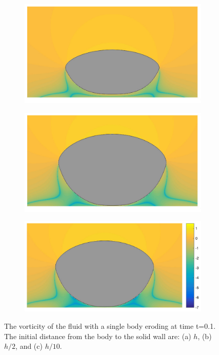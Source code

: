 \documentclass[preprint,10pt]{elsarticle}
\begin{document}
\begin{figure}[H]
\begin{center}
\begin{subfigure}[b]{0.3\textwidth}
\includegraphics[width = \textwidth]{./figs/1b_0d4r1h_vort}
\caption{}
\end{subfigure}
\begin{subfigure}[b]{0.3\textwidth}
\includegraphics[width = \textwidth]{./figs/1b_0d4r0d5h_vort}
\caption{}
\end{subfigure}
\begin{subfigure}[b]{0.33\textwidth}
\includegraphics[width = \textwidth]{./figs/1b_0d4r0d1h_vort}
\caption{}
\end{subfigure}
\caption{\label{fig:NearWall_vort} The vorticity of the fluid with a
single body eroding at time t=0.1. The initial distance from the body to
the solid wall are: (a) $h$, (b) $h/2$, and (c) $h/10$.}
\end{center}
\end{figure}
\end{document}

